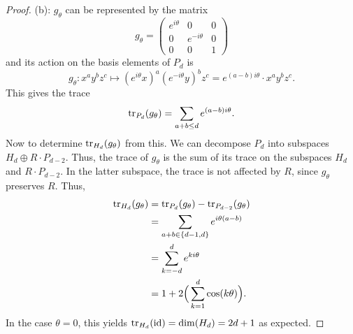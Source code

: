 \documentclass{amsart}
\begin{document}
\begin{proof}
		(b): $g_{\theta}$ can be represented by the matrix
		$$
		g_{\theta} = \begin{pmatrix}
			e^{i\theta} & 0 & 0 \\
			0 & e^{-i\theta} & 0\\
			0 & 0 & 1
		\end{pmatrix}
		$$
		and its action on the basis elements of $P_d$ is
		$$
		g_{\theta}: x^ay^bz^c \mapsto (e^{i\theta}x)^a(e^{-i\theta}y)^bz^c = e^{(a-b)i\theta} \cdot x^ay^bz^c.
		$$
		This gives the trace
		$$
		\operatorname{tr}_{P_d}(g_{\theta}) = \sum_{a+b\leq d} e^{(a-b)i\theta}.
		$$
		Now to determine $\operatorname{tr}_{H_d}(g_{\theta})$ from this. We can decompose $P_d$ into subspaces $H_d\oplus R\cdot P_{d-2}$. Thus, the trace of $g_{\theta}$ is the sum of its trace on the subspaces $H_d$ and $R\cdot P_{d-2}$. In the latter subspace, the trace is not affected by $R$, since $g_{\theta}$ preserves $R$. Thus,
		\begin{align*}
		\operatorname{tr}_{H_d}(g_{\theta}) &= \operatorname{tr}_{P_d}(g_{\theta}) - \operatorname{tr}_{P_{d-2}}(g_{\theta}) \\
		&= \sum_{a+b \in \{d-1,d\}} e^{i\theta(a-b)}\\
		&= \sum_{k=-d}^{d} e^{ki\theta}\\
		&= 1 + 2\Big(\sum_{k=1}^{d} \cos(k\theta)\Big).\\
		\end{align*}
		In the case $\theta = 0$, this yields $\operatorname{tr}_{H_d}(\operatorname{id})=\dim(H_d)=2d+1$ as expected.
		
	\end{proof}
	
\end{document}
